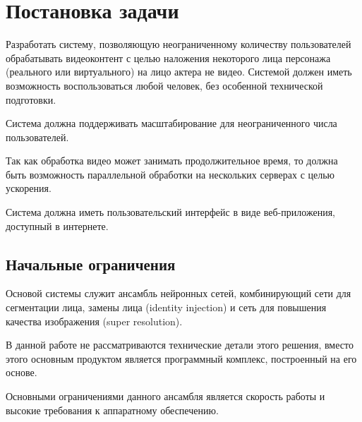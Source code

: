 \section{Постановка задачи}

Разработать систему, позволяющую неограниченному количеству пользователей обрабатывать видеоконтент с целью наложения некоторого лица персонажа (реального или виртуального) на лицо актера не видео. Системой должен иметь возможность воспользоваться любой человек, без особенной технической подготовки.

Система должна поддерживать масштабирование для неограниченного числа пользователей.

Так как обработка видео может занимать продолжительное время, то должна быть возможность параллельной обработки на нескольких серверах с целью ускорения.

Система должна иметь пользовательский интерфейс в виде веб-приложения, доступный в интернете.


\subsection{Начальные ограничения}

Основой системы служит ансамбль нейронных сетей, комбинирующий сети для сегментации лица, замены лица (identity injection) и сеть для повышения качества изображения (super resolution).

В данной работе не рассматриваются технические детали этого решения, вместо этого основным продуктом является программный комплекс, построенный на его основе.

Основными ограничениями данного ансамбля является скорость работы и высокие требования к аппаратному обеспечению.
